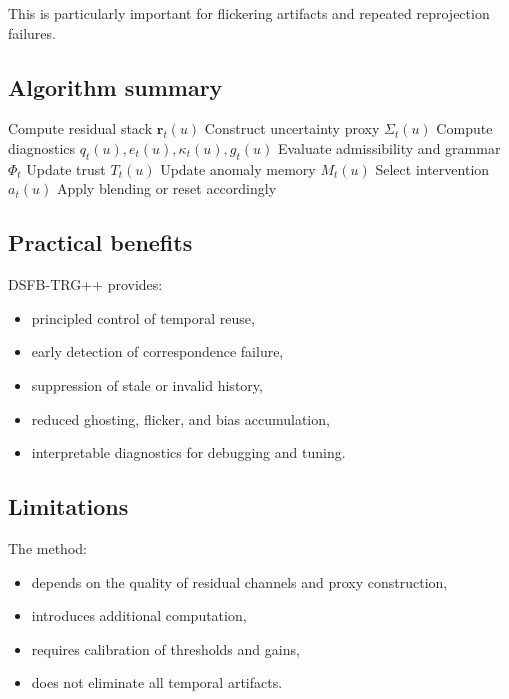 \documentclass[11pt]{article}
\theoremstyle{definition}
\theoremstyle{plain}
\begin{document}
This is particularly important for flickering artifacts and repeated reprojection failures.


\subsection{Algorithm summary}

\begin{algorithm}[H]
\caption{DSFB-TRG++ Temporal Reuse}
\begin{algorithmic}[1]
    \State Compute residual stack $\mathbf r_t(u)$
    \State Construct uncertainty proxy $\Sigma_t(u)$
    \State Compute diagnostics $q_t(u), e_t(u), \kappa_t(u), g_t(u)$
    \State Evaluate admissibility and grammar $\Phi_t$
    \State Update trust $T_t(u)$
    \State Update anomaly memory $M_t(u)$
    \State Select intervention $a_t(u)$
    \State Apply blending or reset accordingly
\EndFor
\end{algorithmic}
\end{algorithm}


\subsection{Practical benefits}

DSFB-TRG++ provides:
\begin{itemize}[leftmargin=1.5em]
    \item principled control of temporal reuse,
    \item early detection of correspondence failure,
    \item suppression of stale or invalid history,
    \item reduced ghosting, flicker, and bias accumulation,
    \item interpretable diagnostics for debugging and tuning.
\end{itemize}


\subsection{Limitations}

The method:
\begin{itemize}[leftmargin=1.5em]
    \item depends on the quality of residual channels and proxy construction,
    \item introduces additional computation,
    \item requires calibration of thresholds and gains,
    \item does not eliminate all temporal artifacts.
\end{itemize}
\end{document}
